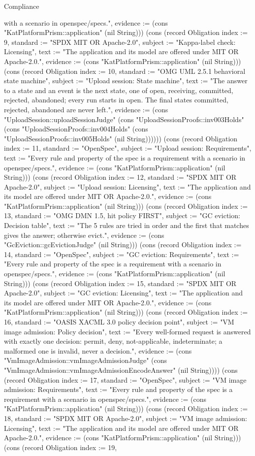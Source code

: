 \begin{lexlean}{Compliance}
\begin{semanticmodule}
{with a scenario in openspec/specs.", evidence := (cons "KatPlatformPrism::application" (nil String))}) (cons (record Obligation {index := 9, standard := "SPDX MIT OR Apache-2.0", subject := "Kappa-label check: Licensing", text := "The application and its model are offered under MIT OR Apache-2.0.", evidence := (cons "KatPlatformPrism::application" (nil String))}) (cons (record Obligation {index := 10, standard := "OMG UML 2.5.1 behavioral state machine", subject := "Upload session: State machine", text := "The answer to a state and an event is the next state, one of open, receiving, committed, rejected, abandoned; every run starts in open. The final states committed, rejected, abandoned are never left.", evidence := (cons "UploadSession::uploadSessionJudge" (cons "UploadSessionProofs::inv003Holds" (cons "UploadSessionProofs::inv004Holds" (cons "UploadSessionProofs::inv005Holds" (nil String)))))}) (cons (record Obligation {index := 11, standard := "OpenSpec", subject := "Upload session: Requirements", text := "Every rule and property of the spec is a requirement with a scenario in openspec/specs.", evidence := (cons "KatPlatformPrism::application" (nil String))}) (cons (record Obligation {index := 12, standard := "SPDX MIT OR Apache-2.0", subject := "Upload session: Licensing", text := "The application and its model are offered under MIT OR Apache-2.0.", evidence := (cons "KatPlatformPrism::application" (nil String))}) (cons (record Obligation {index := 13, standard := "OMG DMN 1.5, hit policy FIRST", subject := "GC eviction: Decision table", text := "The 5 rules are tried in order and the first that matches gives the answer; otherwise evict.", evidence := (cons "GcEviction::gcEvictionJudge" (nil String))}) (cons (record Obligation {index := 14, standard := "OpenSpec", subject := "GC eviction: Requirements", text := "Every rule and property of the spec is a requirement with a scenario in openspec/specs.", evidence := (cons "KatPlatformPrism::application" (nil String))}) (cons (record Obligation {index := 15, standard := "SPDX MIT OR Apache-2.0", subject := "GC eviction: Licensing", text := "The application and its model are offered under MIT OR Apache-2.0.", evidence := (cons "KatPlatformPrism::application" (nil String))}) (cons (record Obligation {index := 16, standard := "OASIS XACML 3.0 policy decision point", subject := "VM image admission: Policy decision", text := "Every well-formed request is answered with exactly one decision: permit, deny, not-applicable, indeterminate; a malformed one is invalid, never a decision.", evidence := (cons "VmImageAdmission::vmImageAdmissionJudge" (cons "VmImageAdmission::vmImageAdmissionEncodeAnswer" (nil String)))}) (cons (record Obligation {index := 17, standard := "OpenSpec", subject := "VM image admission: Requirements", text := "Every rule and property of the spec is a requirement with a scenario in openspec/specs.", evidence := (cons "KatPlatformPrism::application" (nil String))}) (cons (record Obligation {index := 18, standard := "SPDX MIT OR Apache-2.0", subject := "VM image admission: Licensing", text := "The application and its model are offered under MIT OR Apache-2.0.", evidence := (cons "KatPlatformPrism::application" (nil String))}) (cons (record Obligation {index := 19, }
\end{semanticmodule}
\end{lexlean}
